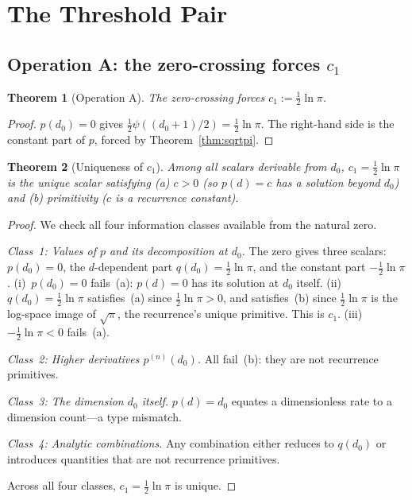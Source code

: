 \documentclass[11pt,a4paper]{article}
\newtheorem{theorem}{Theorem}[section]
\begin{document}
\section{The Threshold Pair}

\subsection{Operation A: the zero-crossing forces $c_1$}

\begin{theorem}[Operation A]\label{thm:opA}
The zero-crossing forces $c_1 := \tfrac{1}{2}\ln\pi$.
\end{theorem}

\begin{proof}
$p(d_0) = 0$ gives $\frac{1}{2}\psi((d_0+1)/2) = \frac{1}{2}\ln\pi$.
The right-hand side is the constant part of $p$, forced by
Theorem~\ref{thm:sqrtpi}.
\end{proof}

\begin{theorem}[Uniqueness of $c_1$]\label{thm:c1unique}
Among all scalars derivable from $d_0$, $c_1 = \tfrac{1}{2}\ln\pi$ is the
unique scalar satisfying (a) $c > 0$ (so $p(d) = c$ has a solution beyond
$d_0$) and (b) primitivity ($c$ is a recurrence constant).
\end{theorem}

\begin{proof}
We check all four information classes available from the natural zero.

\emph{Class~1: Values of $p$ and its decomposition at $d_0$.} The zero
gives three scalars: $p(d_0) = 0$, the $d$-dependent part
$q(d_0) = \frac{1}{2}\ln\pi$, and the constant part
$-\frac{1}{2}\ln\pi$. (i)~$p(d_0) = 0$ fails~(a): $p(d) = 0$ has its
solution at $d_0$ itself. (ii)~$q(d_0) = \frac{1}{2}\ln\pi$ satisfies~(a)
since $\frac{1}{2}\ln\pi > 0$, and satisfies~(b) since
$\frac{1}{2}\ln\pi$ is the log-space image of $\sqrt{\pi}$, the
recurrence's unique primitive. This is $c_1$. (iii)~$-\frac{1}{2}\ln\pi < 0$
fails~(a).

\emph{Class~2: Higher derivatives $p^{(n)}(d_0)$.} All fail~(b): they are
not recurrence primitives.

\emph{Class~3: The dimension $d_0$ itself.} $p(d) = d_0$ equates a
dimensionless rate to a dimension count---a type mismatch.

\emph{Class~4: Analytic combinations.} Any combination either reduces to
$q(d_0)$ or introduces quantities that are not recurrence primitives.

Across all four classes, $c_1 = \frac{1}{2}\ln\pi$ is unique.
\end{proof}
\end{document}
